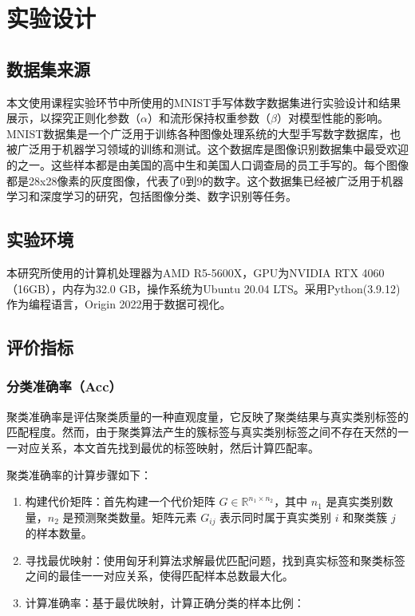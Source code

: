\documentclass[12pt,a4paper,UTF8]{article}
\begin{document}
 \section{实验设计}
 \subsection{数据集来源}
 本文使用课程实验环节中所使用的MNIST手写体数字数据集进行实验设计和结果展示，以探究正则化参数（$\alpha$）和流形保持权重参数（$\beta$）对模型性能的影响。MNIST数据集是一个广泛用于训练各种图像处理系统的大型手写数字数据库，也被广泛用于机器学习领域的训练和测试。这个数据库是图像识别数据集中最受欢迎的之一。这些样本都是由美国的高中生和美国人口调查局的员工手写的。每个图像都是28x28像素的灰度图像，代表了0到9的数字。这个数据集已经被广泛用于机器学习和深度学习的研究，包括图像分类、数字识别等任务。
 
 \subsection{实验环境}
 本研究所使用的计算机处理器为AMD R5-5600X，GPU为NVIDIA RTX 4060（16GB），内存为32.0 GB，操作系统为Ubuntu 20.04 LTS。采用Python(3.9.12)作为编程语言，Origin 2022用于数据可视化。
 
 \subsection{评价指标}
 \subsubsection{分类准确率（Acc）}
 聚类准确率是评估聚类质量的一种直观度量，它反映了聚类结果与真实类别标签的匹配程度。然而，由于聚类算法产生的簇标签与真实类别标签之间不存在天然的一一对应关系，本文首先找到最优的标签映射，然后计算匹配率。
 
 聚类准确率的计算步骤如下：
    \begin{enumerate}
 	\item 构建代价矩阵：首先构建一个代价矩阵 $G \in \mathbb{R}^{n_1 \times n_2}$，其中 $n_1$ 是真实类别数量，$n_2$ 是预测聚类数量。矩阵元素 $G_{ij}$ 表示同时属于真实类别 $i$ 和聚类簇 $j$ 的样本数量。
 	\item 寻找最优映射：使用匈牙利算法求解最优匹配问题，找到真实标签和聚类标签之间的最佳一一对应关系，使得匹配样本总数最大化。
 	\item  计算准确率：基于最优映射，计算正确分类的样本比例： 
 \end{enumerate}
\end{document}
